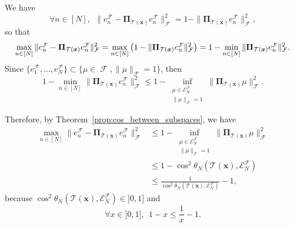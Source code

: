 \documentclass[twoside,11pt]{book}
\numberwithin{theorem}{chapter}
\numberwithin{definition}{chapter}
\numberwithin{proposition}{chapter}
\numberwithin{corollary}{chapter}
\numberwithin{example}{chapter}
\numberwithin{lemma}{chapter}
\numberwithin{assumption}{chapter}
\numberwithin{equation}{chapter}
\numberwithin{figure}{chapter}
\DeclareMathOperator{\F}{\mathcal{F}}
\begin{document}
We have
\begin{equation}
\forall n \in [N], \:\:\|e_{n}^{\F} - \bm{\Pi}_{\mathcal{T}(\bm{x})} e_{n}^{\F} \|_{\mathcal{F}}^{2} = 1-\|\bm{\Pi}_{\mathcal{T}(\bm{x})} e_{n}^{\F} \|_{\mathcal{F}}^{2},
\end{equation}
so that
\begin{equation}
\max_{ n \in [N]} \|e_{n}^{\F} - \bm{\Pi}_{\mathcal{T}(\bm{x})} e_{n}^{\F}\|_{\mathcal{F}}^{2} = \max_{ n \in [N]} \big(1 - \|\bm{\Pi}_{\mathcal{T}(\bm{x})} e_{n}^{\F}\|_{\mathcal{F}}^{2}\big) \\
 = 1-\min_{ n \in [N]} \|\bm{\Pi}_{\mathcal{T}(\bm{x})} e_{n}^{\F}\|_{\mathcal{F}}^{2}.
\end{equation}
Since $\{e_{1}^{\F}, \dots, e_{N}^{\F} \} \subset \{ \mu \in \F, \|\mu\|_{\F} = 1 \}$, then
\begin{equation}
1-\min_{ n \in [N]} \|\bm{\Pi}_{\mathcal{T}(\bm{x})} e_{n}^{\F}\|_{\mathcal{F}}^{2} \leq 1-\inf_{\substack{\mu \in \mathcal{E}_{N}^{\mathcal{F}}\\ \|\mu\|_{\mathcal{F}}=1}} \|\bm{\Pi}_{\mathcal{T}(\bm{x})} \mu\|_{\mathcal{F}}^{2}.
\end{equation}


Therefore, by Theorem~\ref{prop:cos_between_subspaces}, we have
\begin{align}\label{eq:max_error_as_function_of_cos_proof}
	\max_{ n \in [N]} \|e_{n}^{\F} - \bm{\Pi}_{\mathcal{T}(\bm{x})} e_{n}^{\F}\|_{\mathcal{F}}^{2} & \leq 1-\inf_{\substack{\mu \in \mathcal{E}_{N}^{\mathcal{F}}\\ \|\mu\|_{\mathcal{F}}=1}} \|\bm{\Pi}_{\mathcal{T}(\bm{x})} \mu\|_{\mathcal{F}}^{2}\\
	& \leq 1-\cos^{2} \theta_{N}(\mathcal{T}(\bm{x}),\mathcal{E}^{\mathcal{F}}_{N})\\
	& \leq \frac{1}{\cos^{2} \theta_{N}(\mathcal{T}(\bm{x}),\mathcal{E}^{\mathcal{F}}_{N})} - 1,
\end{align}
because $\cos^{2} \theta_{N}(\mathcal{T}(\bm{x}),\mathcal{E}^{\mathcal{F}}_{N}) \in ]0,1]$ and 
\begin{equation}
\forall x \in ]0,1], \:\: 1-x \leq \frac{1}{x}-1.
\end{equation}
\end{document}
